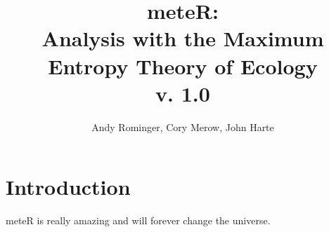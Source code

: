 \documentclass[10pt]{article}
\begin{document}

\renewenvironment{Schunk}{\vspace{\topsep}}{\vspace{\topsep}}


\title{ meteR: \\ Analysis with the Maximum Entropy Theory of Ecology \\ v. 1.0 }
\author{Andy Rominger, Cory Merow, John Harte}
\maketitle
\tableofcontents





\newpage
\section{Introduction}
meteR is really amazing and will forever change the universe.
\end{document}
